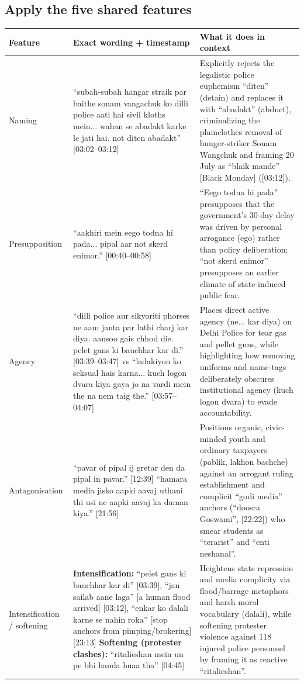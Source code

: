 \documentclass[10pt,a4paper]{article}
\begin{document}
\subsection*{Apply the five shared features}
\par\vspace{4pt}
{\small
\begin{longtable}{@{}>{\raggedright\arraybackslash}p{} >{\raggedright\arraybackslash}p{} >{\raggedright\arraybackslash}p{}@{}}
\toprule
\textbf{Feature} & \textbf{Exact wording + timestamp} & \textbf{What it does in context} \\
\midrule
\endhead
Naming & ``subah-subah hangar straik par baithe sonam vangachuk ko dilli police aati hai sivil kloths mein... wahan se abadakt karke le jati hai. not diten abadakt'' [03:02--03:12] & Explicitly rejects the legalistic police euphemism ``diten'' (detain) and replaces it with ``abadakt'' (abduct), criminalizing the plainclothes removal of hunger-striker Sonam Wangchuk and framing 20 July as ``blaik mande'' [Black Monday] ([03:12]). \\
\addlinespace[6pt]
Presupposition & ``aakhiri mein eego todna hi pada... pipal aar not skerd enimor.'' [00:40--00:58] & ``Eego todna hi pada'' presupposes that the government's 30-day delay was driven by personal arrogance (ego) rather than policy deliberation; ``not skerd enimor'' presupposes an earlier climate of state-induced public fear. \\
\addlinespace[6pt]
Agency & ``dilli police aur sikyoriti phorses ne aam janta par lathi charj kar diya. aansoo gais chhod die. pelet gans ki bauchhar kar di.'' [03:39--03:47] vs ``ladakiyon ko seksual hais karna... kuch logon dvara kiya gaya jo na vardi mein the na nem taig the.'' [03:57--04:07] & Places direct active agency (ne... kar diya) on Delhi Police for tear gas and pellet guns, while highlighting how removing uniforms and name-tags deliberately obscures institutional agency (kuch logon dvara) to evade accountability. \\
\addlinespace[6pt]
Antagonisation & ``pavar of pipal ij gretar den da pipal in pavar.'' [12:39] \newline  ``hamara media jisko aapki aavaj uthani thi usi ne aapki aavaj ka daman kiya.'' [21:56] & Positions organic, civic-minded youth and ordinary taxpayers (pablik, lakhon bachche) against an arrogant ruling establishment and complicit ``godi media'' anchors (``doosra Goswami'', [22:22]) who smear students as ``terarist'' and ``enti neshanal''. \\
\addlinespace[6pt]
Intensification / softening & \textbf{Intensification:} ``pelet gans ki bauchhar kar di'' [03:39], ``jan sailab aane laga'' [a human flood arrived] [03:12], ``enkar ko dalali karne se nahin roka'' [stop anchors from pimping/brokering] [23:13] \newline  \textbf{Softening (protester clashes):} ``ritalieshan mein un pe bhi hamla huaa tha'' [04:45] & Heightens state repression and media complicity via flood/barrage metaphors and harsh moral vocabulary (dalali), while softening protester violence against 118 injured police personnel by framing it as reactive ``ritalieshan''. \\
\bottomrule
\end{longtable}
}
\end{document}
